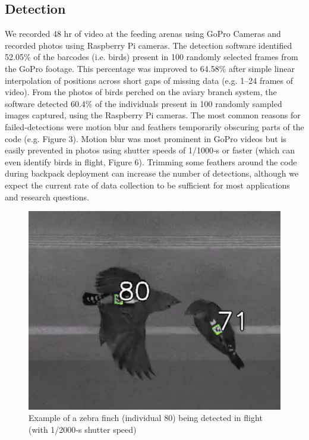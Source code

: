 \documentclass[11pt,a4paper,oneside]{book}
\begin{document}
\subsection{Detection}
We recorded 48 hr of video at the feeding arenas using GoPro Cameras and recorded photos using Raspberry Pi cameras. The detection software identified 52.05\% of the barcodes (i.e. birds) present in 100 randomly selected frames from the GoPro footage. This percentage was improved to 64.58\% after simple linear interpolation of positions across short gaps of missing data (e.g. 1–24 frames of video). From the photos of birds perched on the aviary branch system, the software detected 60.4\% of the individuals present in 100 randomly sampled images captured, using the Raspberry Pi cameras. The most common reasons for failed‐detections were motion blur and feathers temporarily obscuring parts of the code (e.g. Figure 3). Motion blur was most prominent in GoPro videos but is easily prevented in photos using shutter speeds of 1/1000‐s or faster (which can even identify birds in flight, Figure 6). Trimming some feathers around the code during backpack deployment can increase the number of detections, although we expect the current rate of data collection to be sufficient for most applications and research questions.

\begin{figure}[!htb]
    \centering
    \includegraphics{Graving_IMPRS_Thesis/figures/bird_figure_6.jpg}
    \caption{Example of a zebra finch (individual 80) being detected in flight (with 1/2000‐s shutter speed)
}
    \label{fig:bird_figure_6}
\end{figure}
\end{document}
